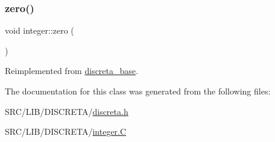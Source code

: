 \mbox{\label{classinteger_ab99e796e5c2cef13eb30dc43eac3c9fe}} 
\subsubsection{\texorpdfstring{zero()}{zero()}}
{\footnotesize\ttfamily void integer\+::zero (\begin{DoxyParamCaption}{ }\end{DoxyParamCaption})\hspace{0.3cm}{\ttfamily [virtual]}}



Reimplemented from \mbox{\hyperlink{classdiscreta__base_a424aa44bbb6ca48d30ad1087dbd6f210}{discreta\+\_\+base}}.



The documentation for this class was generated from the following files\+:\begin{DoxyCompactItemize}
\item 
S\+R\+C/\+L\+I\+B/\+D\+I\+S\+C\+R\+E\+T\+A/\mbox{\hyperlink{discreta_8h}{discreta.\+h}}\item 
S\+R\+C/\+L\+I\+B/\+D\+I\+S\+C\+R\+E\+T\+A/\mbox{\hyperlink{integer_8_c}{integer.\+C}}\end{DoxyCompactItemize}
